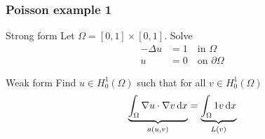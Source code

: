 \begin{frame}
  \frametitle{Poisson example 1}
  \begin{block}{Strong form}
    Let $\Omega = [0,1]\times[0,1]$. Solve
    \begin{align*}
      -\Delta u &= 1 \quad \text{in } \Omega \\
              u &= 0 \quad \text{on } \partial \Omega
    \end{align*}
  \end{block}
  \vspace{-1em}
  \begin{block}{Weak form}   
    Find $u \in H^1_0(\Omega)$ such that for all $v \in H^1_0(\Omega)$
    \begin{equation*}
      \underbrace{
      \int_{\Omega} \nabla u \cdot \nabla v \, \mathrm{d}x
    }_{a(u,v)}
        = \underbrace{
          \int_{\Omega} 1 v \, \mathrm{d}x
        }_{L(v)}
    \end{equation*}
  \end{block}
\end{frame}
